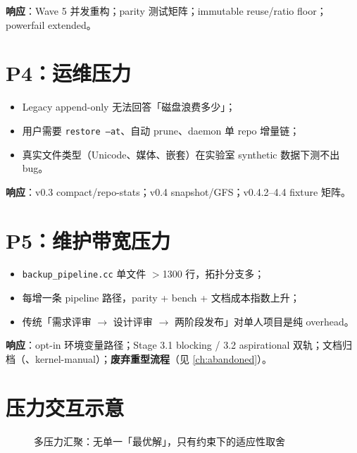 \textbf{响应}：Wave 5 并发重构；parity 测试矩阵；immutable reuse/ratio floor；powerfail extended。

\section{P4：运维压力}

\begin{pressbox}[压力来源]
\begin{itemize}[nosep]
  \item Legacy append-only  无法回答「磁盘浪费多少」；
  \item 用户需要 \texttt{restore --at}、自动 prune、daemon 单 repo 增量链；
  \item 真实文件类型（Unicode、媒体、嵌套）在实验室 synthetic 数据下测不出 bug。
\end{itemize}
\end{pressbox}

\textbf{响应}：v0.3 compact/repo-stats；v0.4 snapshot/GFS；v0.4.2--4.4 fixture 矩阵。

\section{P5：维护带宽压力}

\begin{pressbox}[压力来源]
\begin{itemize}[nosep]
  \item \texttt{backup\_pipeline.cc} 单文件 $>$1300 行，拓扑分支多；
  \item 每增一条 pipeline 路径，parity + bench + 文档成本指数上升；
  \item 传统「需求评审 $\rightarrow$ 设计评审 $\rightarrow$ 两阶段发布」对单人项目是纯 overhead。
\end{itemize}
\end{pressbox}

\textbf{响应}：opt-in 环境变量路径；Stage 3.1 blocking / 3.2 aspirational 双轨；文档归档（、kernel-manual）；\textbf{废弃重型流程}（见 \cref{ch:abandoned}）。

\section{压力交互示意}

\begin{figure}[htbp]
\centering
{}
\caption{多压力汇聚：无单一「最优解」，只有约束下的适应性取舍}
\end{figure}

